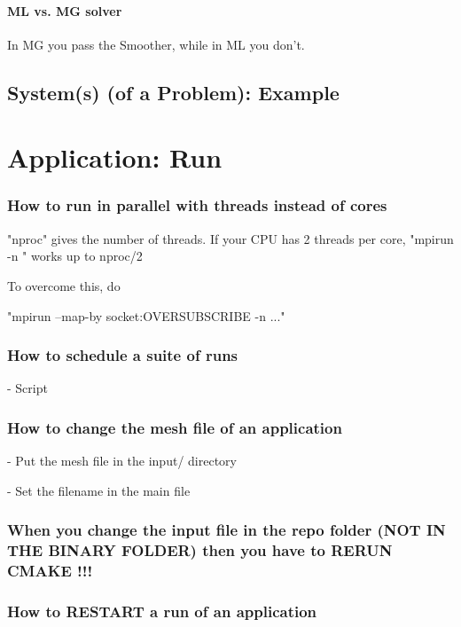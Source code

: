 \documentclass[10pt]{book}
\begin{document}
  
 
  
 \subsection{ML vs. MG solver}

 In MG you pass the Smoother, while in ML you don't.
 
   \chapter{System(s) (of a Problem): Example}


 \part{Application: Run}

 \section{How to run in parallel with threads instead of cores}


"nproc" gives the number of threads. If your CPU has 2 threads per core, "mpirun -n " works up to nproc/2

To overcome this, do

"mpirun --map-by socket:OVERSUBSCRIBE -n ..."


 \section{How to schedule a suite of runs}

- Script

 \section{How to change the mesh file of an application}

- Put the mesh file in the input/ directory

- Set the filename in the main file

\section{When you change the input file in the repo folder (NOT IN THE BINARY FOLDER) then you have to RERUN CMAKE !!!}
 
 

 \section{How to RESTART a run of an application}
 
\end{document}
